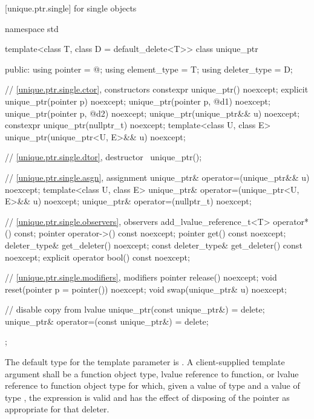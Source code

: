 [unique.ptr.single]{ for single objects}

%
\begin{codeblock}
namespace std {
  template<class T, class D = default_delete<T>> class unique_ptr {
  public:
    using pointer      = @\seebelow@;
    using element_type = T;
    using deleter_type = D;

    // \ref{unique.ptr.single.ctor}, constructors
    constexpr unique_ptr() noexcept;
    explicit unique_ptr(pointer p) noexcept;
    unique_ptr(pointer p, @\seebelow@ d1) noexcept;
    unique_ptr(pointer p, @\seebelow@ d2) noexcept;
    unique_ptr(unique_ptr&& u) noexcept;
    constexpr unique_ptr(nullptr_t) noexcept;
    template<class U, class E>
      unique_ptr(unique_ptr<U, E>&& u) noexcept;

    // \ref{unique.ptr.single.dtor}, destructor
    ~unique_ptr();

    // \ref{unique.ptr.single.asgn}, assignment
    unique_ptr& operator=(unique_ptr&& u) noexcept;
    template<class U, class E>
      unique_ptr& operator=(unique_ptr<U, E>&& u) noexcept;
    unique_ptr& operator=(nullptr_t) noexcept;

    // \ref{unique.ptr.single.observers}, observers
    add_lvalue_reference_t<T> operator*() const;
    pointer operator->() const noexcept;
    pointer get() const noexcept;
    deleter_type& get_deleter() noexcept;
    const deleter_type& get_deleter() const noexcept;
    explicit operator bool() const noexcept;

    // \ref{unique.ptr.single.modifiers}, modifiers
    pointer release() noexcept;
    void reset(pointer p = pointer()) noexcept;
    void swap(unique_ptr& u) noexcept;

    // disable copy from lvalue
    unique_ptr(const unique_ptr&) = delete;
    unique_ptr& operator=(const unique_ptr&) = delete;
  };
}
\end{codeblock}

\pnum
The default type for the template parameter  is
. A client-supplied template argument
 shall be a function
object type, lvalue reference to function, or
lvalue reference to function object type
for which, given
a value  of type  and a value
 of type , the expression
 is valid and has the effect of disposing of the
pointer as appropriate for that deleter.

